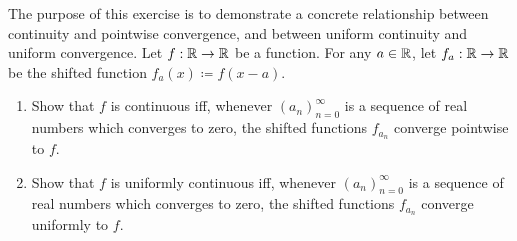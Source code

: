 \exercisesection

\begin{ex}\label{ex:3.2.1}
  The purpose of this exercise is to demonstrate a concrete relationship between continuity and pointwise convergence, and between uniform continuity and uniform convergence.
  Let \(f : \mathbb{R} \to \mathbb{R}\) be a function.
  For any \(a \in \mathbb{R}\), let \(f_a : \mathbb{R} \to \mathbb{R}\) be the shifted function \(f_a(x) \coloneqq f(x - a)\).
  \begin{enumerate}
    \item Show that \(f\) is continuous iff, whenever \((a_n)_{n = 0}^\infty\) is a sequence of real numbers which converges to zero, the shifted functions \(f_{a_n}\) converge pointwise to \(f\).
    \item Show that \(f\) is uniformly continuous iff, whenever \((a_n)_{n = 0}^\infty\) is a sequence of real numbers which converges to zero, the shifted functions \(f_{a_n}\) converge uniformly to \(f\).
  \end{enumerate}
\end{ex}

